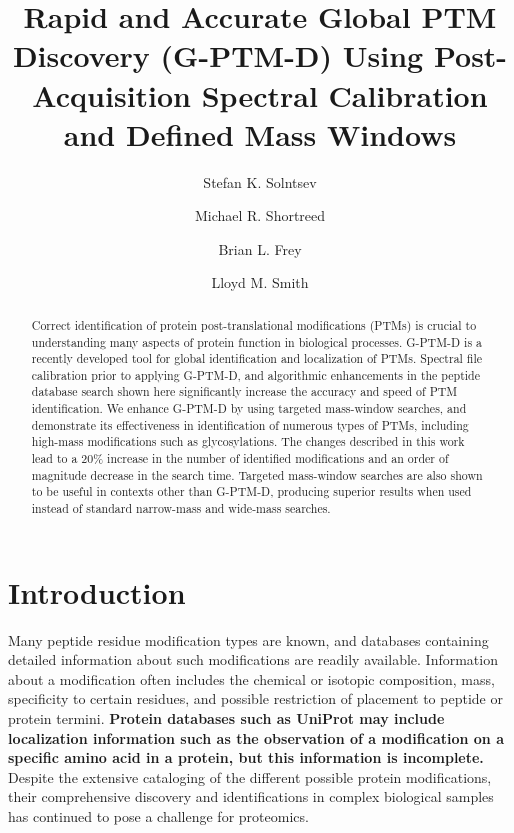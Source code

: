 \documentclass[journal=jprobs,manuscript=article]{achemso}
\author{Stefan K. Solntsev}
\author{Michael R. Shortreed}
\author{Brian L. Frey}
\author{Lloyd M. Smith}
\affiliation[UwMadison]
{University of Wisconsin-Madison}
\title[Rapid and Accurate Global PTM Discovery (G-PTM-D) Using Post-Acquisition Spectral Calibration and Defined Mass Windows]
  {Rapid and Accurate Global PTM Discovery (G-PTM-D) Using Post-Acquisition Spectral Calibration and Defined Mass Windows}
\begin{document}
\begin{abstract}

Correct identification of protein post-translational modifications (PTMs) is crucial to understanding many aspects of protein function in biological processes.
G-PTM-D\cite{Li_2016} is a recently developed tool for global identification and localization of PTMs.
Spectral file calibration prior to applying G-PTM-D, and algorithmic enhancements in the peptide database search shown here significantly increase the accuracy and speed of PTM identification.
We enhance G-PTM-D by using targeted mass-window searches, and demonstrate its effectiveness in identification of numerous types of PTMs, including high-mass modifications such as glycosylations.
The changes described in this work lead to a 20\% increase in the number of identified modifications and an order of magnitude decrease in the search time.
Targeted mass-window searches are also shown to be useful in contexts other than G-PTM-D, producing superior results when used instead of standard narrow-mass and wide-mass searches.
\end{abstract}

\section{Introduction}

Many peptide residue modification types are known, and databases containing detailed information about such modifications are readily available\cite{Creasy_2004}.
Information about a modification often includes the chemical or isotopic composition, mass, specificity to certain residues, and possible restriction of placement to peptide or protein termini.
\textbf{Protein databases such as UniProt may include localization information such as the observation of a modification on a specific amino acid in a protein, but this information is incomplete.}
Despite the extensive cataloging of the different possible protein modifications, their comprehensive discovery and identifications in complex biological samples has continued to pose a challenge for proteomics\cite{Olsen_2013}.
\end{document}
